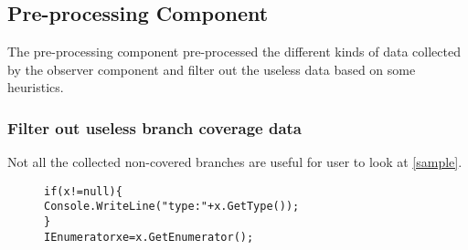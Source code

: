 \subsection{Pre-processing Component}
The pre-processing component pre-processed the different kinds of data collected by the observer component and filter out the useless data based on some heuristics.
\subsubsection{Filter out useless branch coverage data}
Not all the collected non-covered branches are useful for user to look at \ref{sample}. 

\begin{figure}[t]
\begin{CodeOut}
\begin{alltt}
\begin{scriptsize}
if (x != null) \{
   Console.WriteLine("type: " + x.GetType());
\}
IEnumerator xe = x.GetEnumerator();
\end{scriptsize}
\end{alltt}
\end{CodeOut}
\end{figure}


%
%
